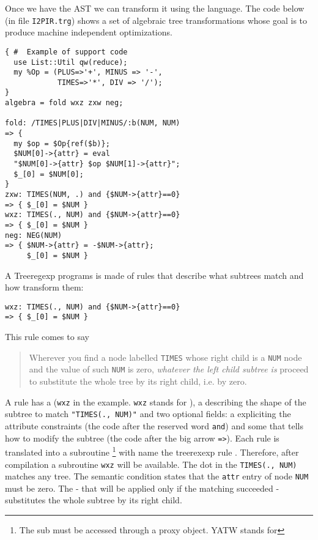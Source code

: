 Once we have the AST we can transform it
using the  language.
The code below (in file \verb|I2PIR.trg|)
shows a set of algebraic tree transformations
whose goal is to produce 
machine independent optimizations.
\begin{verbatim}
{ #  Example of support code
  use List::Util qw(reduce);
  my %Op = (PLUS=>'+', MINUS => '-',
            TIMES=>'*', DIV => '/');
}
algebra = fold wxz zxw neg;

fold: /TIMES|PLUS|DIV|MINUS/:b(NUM, NUM)
=> {
  my $op = $Op{ref($b)};
  $NUM[0]->{attr} = eval
  "$NUM[0]->{attr} $op $NUM[1]->{attr}";
  $_[0] = $NUM[0];
}
zxw: TIMES(NUM, .) and {$NUM->{attr}==0}
=> { $_[0] = $NUM }
wxz: TIMES(., NUM) and {$NUM->{attr}==0}
=> { $_[0] = $NUM }
neg: NEG(NUM)
=> { $NUM->{attr} = -$NUM->{attr};
     $_[0] = $NUM }
\end{verbatim}
A Treeregexp programs is made of  rules
that describe what subtrees match and how transform them:
\begin{verbatim}
wxz: TIMES(., NUM) and {$NUM->{attr}==0}
=> { $_[0] = $NUM }
\end{verbatim}
This rule comes to say 
\begin{quote}
Wherever you find a node labelled \verb|TIMES| whose right
child is a \verb|NUM| node and the value of such \verb|NUM| is
zero, 
\emph{whatever the left child subtree is} proceed to
substitute the whole tree by its right child, i.e. by zero.

\end{quote}

A rule has a  (\verb|wxz| in the example. \verb|wxz|
stands for ), 
a  describing
the shape of the subtree to match \verb|"TIMES(., NUM)"|
and two optional fields:
a  expliciting
the attribute constraints (the code after the reserved word
\verb|and|)
and some  that tells how to 
modify the subtree (the code after the big arrow \verb|=>|).
Each rule is translated into a subroutine 
\footnote{The sub must be accessed 
through a proxy 
 object. YATW stands for }
with name the treerexexp rule .
Therefore, after compilation 
a subroutine \verb|wxz| will be available.
The dot in the  \verb|TIMES(., NUM)| 
matches any tree. The semantic condition
states that the \verb|attr| entry of node
\verb|NUM| must be zero.
The  - that will be 
applied only if the matching succeeded -
substitutes the whole subtree by its 
right child.

